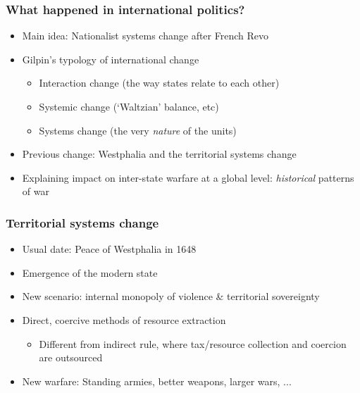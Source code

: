\documentclass[aspectratio=43]{beamer}
\begin{document}
\begin{frame}
\frametitle{What happened in international politics?}
\centering

\begin{itemize}[<+->]
  \item Main idea: Nationalist systems change after French Revo
  \item Gilpin's typology of international change
  \begin{itemize}
    \item Interaction change (the way states relate to each other)
    \item Systemic change (`Waltzian' balance, etc)
    \item Systems change (the very \textit{nature} of the units)
  \end{itemize}
  \item Previous change: Westphalia and the territorial systems change
  \item Explaining impact on inter-state warfare at a global level: \textit{historical} patterns of war
 \end{itemize}

\end{frame}

\begin{frame}
\frametitle{Territorial systems change}
\centering

\begin{itemize}[<+->]
  \item Usual date: Peace of Westphalia in 1648
  \item Emergence of the modern state
  \item New scenario: internal monopoly of violence \& territorial sovereignty
  \item Direct, coercive methods of resource extraction
  \begin{itemize}
    \item Different from indirect rule, where tax/resource collection and coercion are outsourced
  \end{itemize}
  \item New warfare: Standing armies, better weapons, larger wars, ...
\end{itemize}

\end{frame}
\end{document}
